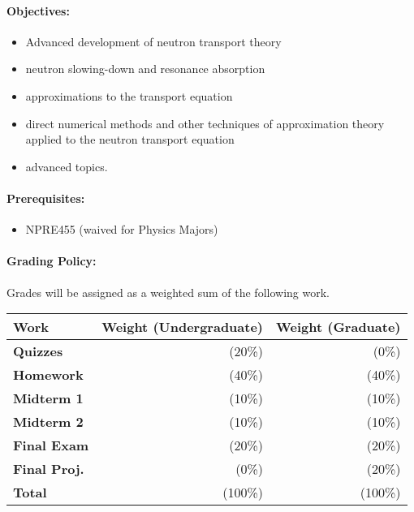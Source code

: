 \documentclass[11pt, a4paper]{article}
\begin{document}
\paragraph{Objectives:}
\begin{itemize}
\item Advanced development of neutron transport theory
\item  neutron slowing-down and resonance absorption
\item  approximations to the transport equation
\item  direct numerical methods and other techniques of approximation theory applied to the neutron transport equation
\item  advanced topics. 
\end{itemize}

\paragraph{Prerequisites:}
\begin{itemize}
\item NPRE455 (waived for Physics Majors) 
\end{itemize}

\paragraph{Grading Policy:} Grades will be assigned as a weighted sum of the
following work.

\begin{table}[h]
\begin{tabularx}{\textwidth}{Xrr}
        \textbf{Work} & \textbf{Weight (Undergraduate)} & \textbf{Weight (Graduate)} \\
\hline
\textbf{Quizzes}     & (20\%)  & (0\%)\\
\textbf{Homework}    & (40\%)  & (40\%)\\
\textbf{Midterm 1}   & (10\%)  & (10\%)\\
\textbf{Midterm 2}   & (10\%)  & (10\%)\\
\textbf{Final Exam}  & (20\%)  & (20\%)\\
\textbf{Final Proj.} & (0\%)   & (20\%)\\
\hline
\textbf{Total}       & (100\%) & (100\%)\\
\end{tabularx}
\end{table}
\end{document}
